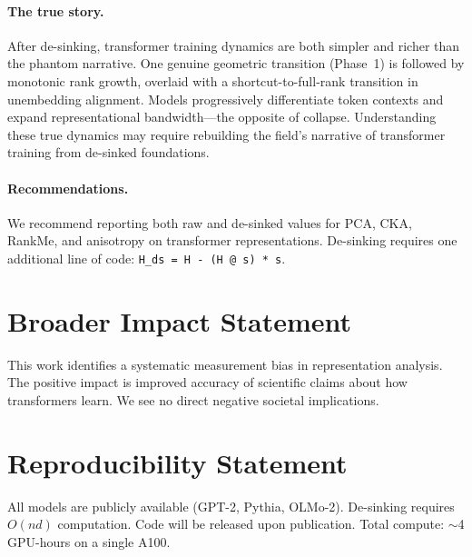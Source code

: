 \documentclass[11pt]{article}
\begin{document}
\paragraph{The true story.}
After de-sinking, transformer training dynamics are both simpler and richer than the phantom narrative.
One genuine geometric transition (Phase~1) is followed by monotonic rank growth, overlaid with a shortcut-to-full-rank transition in unembedding alignment.
Models progressively differentiate token contexts and expand representational bandwidth---the opposite of collapse.
Understanding these true dynamics may require rebuilding the field's narrative of transformer training from de-sinked foundations.

\paragraph{Recommendations.}
We recommend reporting both raw and de-sinked values for PCA, CKA, RankMe, and anisotropy on transformer representations.
De-sinking requires one additional line of code: \texttt{H\_ds = H - (H @ s) * s}.

\section*{Broader Impact Statement}
This work identifies a systematic measurement bias in representation analysis.
The positive impact is improved accuracy of scientific claims about how transformers learn.
We see no direct negative societal implications.

\section*{Reproducibility Statement}
All models are publicly available (GPT-2, Pythia, OLMo-2).
De-sinking requires $O(nd)$ computation.
Code will be released upon publication.
Total compute: ${\sim}$4 GPU-hours on a single A100.
\end{document}
